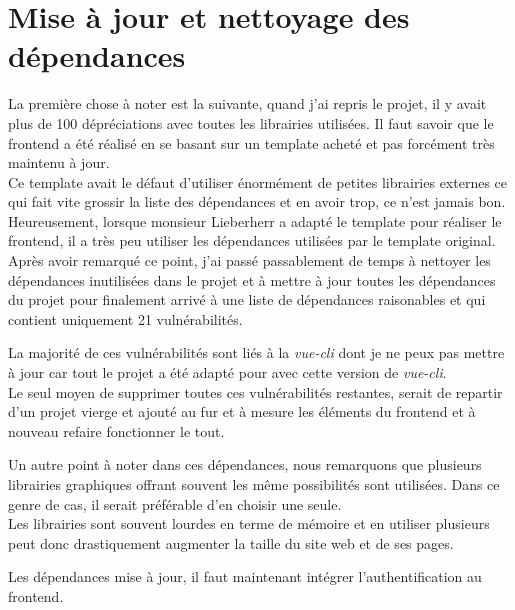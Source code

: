 \documentclass[
    iai, %
    il, %
]{heig-tb}
\begin{document}
\section{Mise à jour et nettoyage des dépendances}
La première chose à noter est la suivante, quand j'ai repris le projet, il y avait plus de 100 dépréciations avec toutes les librairies utilisées. Il faut savoir que le \Gls{frontend} a été réalisé en se basant sur un \Gls{template} acheté et pas forcément très maintenu à jour. \\
Ce \Gls{template} avait le défaut d'utiliser énormément de petites librairies externes ce qui fait vite grossir la liste des dépendances et en avoir trop, ce n'est jamais bon. \\
Heureusement, lorsque monsieur Lieberherr a adapté le \Gls{template} pour réaliser le \Gls{frontend}, il a très peu utiliser les dépendances utilisées par le \Gls{template} original.\\
Après avoir remarqué ce point, j'ai passé passablement de temps à nettoyer les dépendances inutilisées dans le projet et à mettre à jour toutes les dépendances du projet pour finalement arrivé à une liste de dépendances raisonables et qui contient uniquement 21 vulnérabilités.

La majorité de ces vulnérabilités sont liés à la \emph{vue-cli} dont je ne peux pas mettre à jour car tout le projet a été adapté pour avec cette version de \emph{vue-cli}. \\
Le seul moyen de supprimer toutes ces vulnérabilités restantes, serait de repartir d'un projet vierge et ajouté au fur et à mesure les éléments du \Gls{frontend} et à nouveau refaire fonctionner le tout.

Un autre point à noter dans ces dépendances, nous remarquons que plusieurs librairies graphiques offrant souvent les même possibilités sont utilisées. Dans ce genre de cas, il serait préférable d'en choisir une seule. \\
Les librairies sont souvent lourdes en terme de mémoire et en utiliser plusieurs peut donc drastiquement augmenter la taille du site web et de ses pages.

Les dépendances mise à jour, il faut maintenant intégrer l'authentification au \Gls{frontend}.
\end{document}
